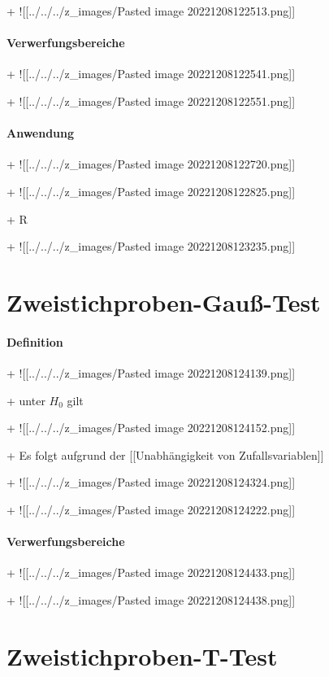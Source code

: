 \documentclass[10pt]{report}
\begin{document}
+ ![[../../../z\_images/Pasted image 20221208122513.png]]


\subsubsection{Verwerfungsbereiche}

+ ![[../../../z\_images/Pasted image 20221208122541.png]]

+ ![[../../../z\_images/Pasted image 20221208122551.png]]


\subsubsection{Anwendung}

+ ![[../../../z\_images/Pasted image 20221208122720.png]]

+ ![[../../../z\_images/Pasted image 20221208122825.png]]

+ R

+ ![[../../../z\_images/Pasted image 20221208123235.png]]
\chapter{Zweistichproben-Gauß-Test}\label{ch:Zweistichproben-Gauß-Test}

\subsubsection{Definition}

+ ![[../../../z\_images/Pasted image 20221208124139.png]]

+ unter $H_0$ gilt

+ ![[../../../z\_images/Pasted image 20221208124152.png]]

+ Es folgt aufgrund der [[Unabhängigkeit von Zufallsvariablen]]

+ ![[../../../z\_images/Pasted image 20221208124324.png]]

+ ![[../../../z\_images/Pasted image 20221208124222.png]]


\subsubsection{Verwerfungsbereiche}

+ ![[../../../z\_images/Pasted image 20221208124433.png]]

+ ![[../../../z\_images/Pasted image 20221208124438.png]]
\chapter{Zweistichproben-T-Test}\label{ch:Zweistichproben-T-Test}
\end{document}

